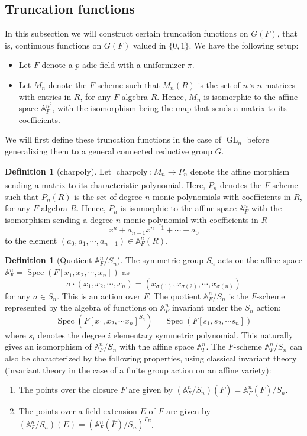\documentclass[11pt,a4paper]{article}
\theoremstyle{definition}
\newtheorem{D}[shared]{Definition}
\theoremstyle{plain}
\theoremstyle{remark}
\theoremstyle{plain}
\DeclareMathOperator{\GL}{GL}
\DeclareMathOperator{\charpoly}{charpoly}
\DeclareMathOperator{\Spec}{Spec}
\begin{document}
\subsection{Truncation functions}
In this subsection we will construct certain truncation functions on $G(F)$, that is, continuous functions on $G(F)$ valued in $\{ 0,1 \}$. We have the following setup:
\begin{itemize}
    \item Let $F$ denote a $p$-adic field with a uniformizer $\pi$.
    \item Let $M_n$ denote the $F$-scheme such that $M_n(R)$ is the set of $n \times n$ matrices with entries in $R$, for any $F$-algebra $R$. Hence, $M_n$ is isomorphic to the affine space $\mathbb{A}^{n^2}_F$, with the isomorphism being the map that sends a matrix to its coefficients.
\end{itemize}

We will first define these truncation functions in the case of $\GL_n$ before generalizing them to a general connected reductive group $G$.

\begin{D}[charpoly]
    Let $\charpoly: M_n \xrightarrow[]{} P_n$ denote the affine morphism sending a matrix to its characteristic polynomial. Here, $P_n$ denotes the $F$-scheme such that $P_n(R)$ is the set of degree $n$ monic polynomials with coefficients in $R$, for any $F$-algebra $R$. Hence, $P_n$ is isomorphic to the affine space $\mathbb{A}^n_F$ with the isomorphism sending a degree $n$ monic polynomial with coefficients in $R$ $$x^n + a_{n-1}x^{n-1} + \cdots + a_0$$ to the element $(a_0, a_1, \cdots, a_{n-1}) \in \mathbb{A}_F^{n}(R)$.
\end{D}

\begin{D}[Quotient $\mathbb{A}_F^n / S_n$]\label{GIT}
    The symmetric group $S_n$ acts on the affine space $\mathbb{A}_F^n = \Spec (F[x_1, x_2, \cdots, x_n])$ as $$\sigma \cdot (x_1, x_2, \cdots, x_n) = (x_{\sigma(1)}, x_{\sigma(2)}, \cdots, x_{\sigma(n)})$$ for any $\sigma \in S_n$. This is an action over $F$. The quotient $\mathbb{A}_F^n/S_n$ is the $F$-scheme represented by the algebra of functions on $\mathbb{A}^n_F$ invariant under the $S_n$ action: $$\Spec(F[x_1, x_2, \cdots x_n]^{S_n}) = \Spec(F[s_1, s_2, \cdots s_n ])$$ where $s_i$ denotes the degree $i$ elementary symmetric polynomial. This naturally gives an isomorphism of $\mathbb{A}_F^n/S_n$ with the affine space $\mathbb{A}^n_F$. The $F$-scheme $\mathbb{A}^n_F/S_n$ can also be characterized by the following properties, using classical invariant theory (invariant theory in the case of a finite group action on an affine variety):
    \begin{enumerate}
        \item The points over the closure $\overline{F}$ are given by $(\mathbb{A}^n_F/S_n)(\overline{F}) = \mathbb{A}^n_F(\overline{F})/S_n$.
        \item The points over a field extension $E$ of $F$ are given by $(\mathbb{A}^n_F/S_n)(E) = (\mathbb{A}^n_F(\overline{F})/S_n)^{\Gamma_E}$.
    \end{enumerate}
\end{D}
\end{document}
